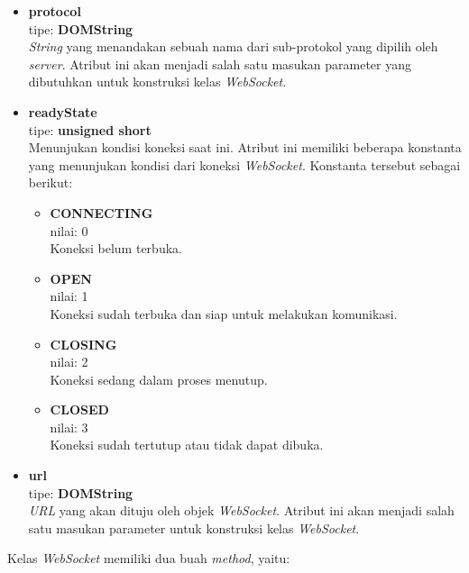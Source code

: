 \begin{itemize}
	\item \textbf{protocol} \\ tipe: \textbf{DOMString} \\ \textit{String} yang menandakan sebuah nama dari sub-protokol yang dipilih oleh \textit{server}. Atribut ini akan menjadi salah satu masukan parameter yang dibutuhkan untuk konstruksi kelas \textit{WebSocket}.
	
	\item \textbf{readyState} \\ tipe: \textbf{unsigned short} \\ Menunjukan kondisi koneksi saat ini. Atribut ini memiliki beberapa konstanta yang menunjukan kondisi dari koneksi \textit{WebSocket}. Konstanta tersebut sebagai berikut:
		\begin{itemize}
			\item \textbf{CONNECTING} \\ nilai: 0 \\ Koneksi belum terbuka.
			\item \textbf{OPEN} \\ nilai: 1 \\ Koneksi sudah terbuka dan siap untuk melakukan komunikasi.
			\item \textbf{CLOSING} \\ nilai: 2 \\ Koneksi sedang dalam proses menutup.
			\item \textbf{CLOSED} \\ nilai: 3 \\ Koneksi sudah tertutup atau tidak dapat dibuka.
		\end{itemize}
	
	\item \textbf{url} \\ tipe: \textbf{DOMString} \\ \textit{URL} yang akan dituju oleh objek \textit{WebSocket}. Atribut ini akan menjadi salah satu masukan parameter untuk konstruksi kelas \textit{WebSocket}.
\end{itemize}

Kelas \textit{WebSocket} memiliki dua buah \textit{method}, yaitu:

